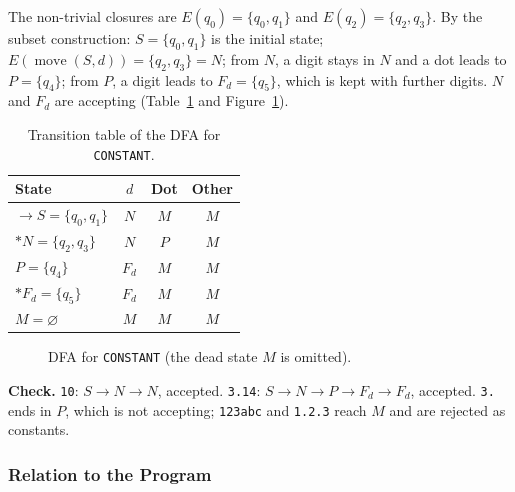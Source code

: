 \documentclass[11pt,letterpaper]{article}
\newcommand{\tok}[1]{\texttt{#1}}
\begin{document}
The non-trivial closures are $E(q_0)=\{q_0,q_1\}$ and
$E(q_2)=\{q_2,q_3\}$. By the subset construction: $S=\{q_0,q_1\}$ is the
initial state; $E(\operatorname{move}(S,d))=\{q_2,q_3\}=N$; from $N$, a digit
stays in $N$ and a dot leads to $P=\{q_4\}$; from $P$, a digit leads to
$F_d=\{q_5\}$, which is kept with further digits. $N$ and $F_d$ are accepting
(Table~\ref{tab:dfa-num} and Figure~\ref{fig:dfa-num}).

\begin{table}[H]
\centering
\begin{tabular}{lccc}
\toprule
State & $d$ & Dot & Other \\
\midrule
$\to S=\{q_0,q_1\}$ & $N$   & $M$ & $M$ \\
$*N=\{q_2,q_3\}$    & $N$   & $P$ & $M$ \\
$P=\{q_4\}$         & $F_d$ & $M$ & $M$ \\
$*F_d=\{q_5\}$      & $F_d$ & $M$ & $M$ \\
$M=\varnothing$     & $M$   & $M$ & $M$ \\
\bottomrule
\end{tabular}
\caption{Transition table of the DFA for \tok{CONSTANT}.}
\label{tab:dfa-num}
\end{table}

\begin{figure}[H]
\centering
{}
\caption{DFA for \tok{CONSTANT} (the dead state $M$ is omitted).}
\label{fig:dfa-num}
\end{figure}

\textbf{Check.} \tok{10}: $S\to N\to N$, accepted. \tok{3.14}:
$S\to N\to P\to F_d\to F_d$, accepted. \tok{3.} ends in $P$, which is not
accepting; \tok{123abc} and \tok{1.2.3} reach $M$ and are rejected as
constants.

\subsubsection{Relation to the Program}
\end{document}
